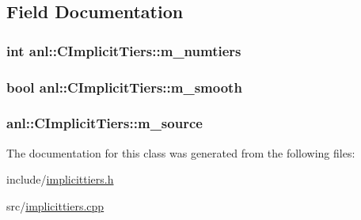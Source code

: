 \subsection{Field Documentation}
\hypertarget{classanl_1_1CImplicitTiers_adf86f9921bbf1130beaf17734b75d59f}{
\subsubsection[{m\_\-numtiers}]{\setlength{\rightskip}{0pt plus 5cm}int {\bf anl::CImplicitTiers::m\_\-numtiers}}}
\label{classanl_1_1CImplicitTiers_adf86f9921bbf1130beaf17734b75d59f}
\hypertarget{classanl_1_1CImplicitTiers_a15bc03072bcabcc244aa1f384fee4f96}{
\subsubsection[{m\_\-smooth}]{\setlength{\rightskip}{0pt plus 5cm}bool {\bf anl::CImplicitTiers::m\_\-smooth}}}
\label{classanl_1_1CImplicitTiers_a15bc03072bcabcc244aa1f384fee4f96}
\hypertarget{classanl_1_1CImplicitTiers_ade315fdea7760e6433a514bd16587548}{
\subsubsection[{m\_\-source}]{ {\bf anl::CImplicitTiers::m\_\-source}}}
\label{classanl_1_1CImplicitTiers_ade315fdea7760e6433a514bd16587548}


The documentation for this class was generated from the following files:\begin{DoxyCompactItemize}
\item 
include/\hyperlink{implicittiers_8h}{implicittiers.h}\item 
src/\hyperlink{implicittiers_8cpp}{implicittiers.cpp}\end{DoxyCompactItemize}
